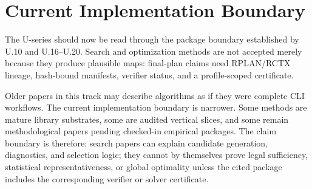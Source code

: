 \section{Current Implementation Boundary}

The U-series should now be read through the package boundary established by
U.10 and U.16--U.20.  Search and optimization methods are not accepted merely
because they produce plausible maps: final-plan claims need RPLAN/RCTX lineage,
hash-bound manifests, verifier status, and a profile-scoped certificate.

Older papers in this track may describe algorithms as if they were complete
CLI workflows.  The current implementation boundary is narrower.  Some methods
are mature library substrates, some are audited vertical slices, and some remain
methodological papers pending checked-in empirical packages.  The claim boundary
is therefore: search papers can explain candidate generation, diagnostics, and
selection logic; they cannot by themselves prove legal sufficiency, statistical
representativeness, or global optimality unless the cited package includes the
corresponding verifier or solver certificate.
